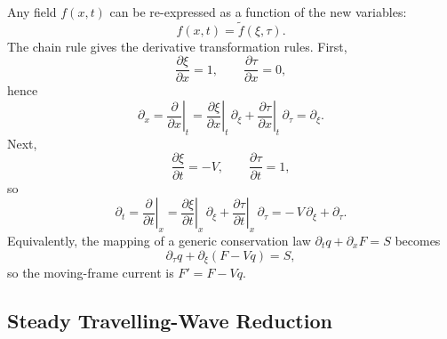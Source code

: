 \documentclass[11pt]{article}
\begin{document}
Any field $f(x,t)$ can be re-expressed as a function of the new variables:
\begin{equation}
f(x,t) = \tilde f(\xi,\tau).
\end{equation}
The chain rule gives the derivative transformation rules. First,
\begin{equation}
\frac{\partial \xi}{\partial x}=1, \qquad \frac{\partial \tau}{\partial x}=0,
\end{equation}
hence
\begin{equation}
\boxed{
\partial_x
=
\left.\frac{\partial}{\partial x}\right|_{t}
=
\left.\frac{\partial \xi}{\partial x}\right|_{t}\,\partial_\xi
+
\left.\frac{\partial \tau}{\partial x}\right|_{t}\,\partial_\tau
=
\partial_\xi.
}
\end{equation}
Next,
\begin{equation}
\frac{\partial \xi}{\partial t}=-V, \qquad \frac{\partial \tau}{\partial t}=1,
\end{equation}
so
\begin{equation}
\boxed{
\partial_t
=
\left.\frac{\partial}{\partial t}\right|_{x}
=
\left.\frac{\partial \xi}{\partial t}\right|_{x}\,\partial_\xi
+
\left.\frac{\partial \tau}{\partial t}\right|_{x}\,\partial_\tau
=
-\,V\,\partial_\xi+\partial_\tau.
}
\end{equation}
Equivalently, the mapping of a generic conservation law
$\partial_t q + \partial_x F = S$ becomes
\begin{equation}
\partial_\tau q + \partial_\xi\!\left(F - V q\right)=S,
\end{equation}
so the moving-frame current is $F' = F - Vq$.

\subsection{Steady Travelling-Wave Reduction}
\end{document}
